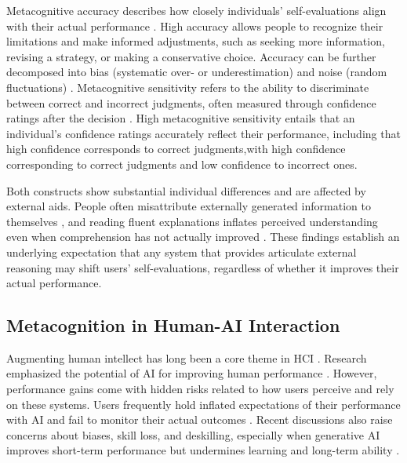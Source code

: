 \documentclass[manuscript, anonymous=false,authorversion,review=false]{acmart}
\begin{document}
Metacognitive accuracy describes how closely individuals' self-evaluations align with their actual performance \cite{fleming2024metacognition, colombatto2023illusions}. High accuracy allows people to recognize their limitations and make informed adjustments, such as seeking more information, revising a strategy, or making a conservative choice. Accuracy can be further decomposed into bias (systematic over- or underestimation) and noise (random fluctuations) \cite{fiedler2019metacognition}. Metacognitive sensitivity refers to the ability to discriminate between correct and incorrect judgments, often measured through confidence ratings after the decision \cite{fleming2024metacognition}. High metacognitive sensitivity entails that an individual's confidence ratings accurately reflect their performance, including that high confidence corresponds to correct judgments,with high confidence corresponding to correct judgments and low confidence to incorrect ones.

Both constructs show substantial individual differences \cite{kelemen2000individual, ackerman2017meta} and are affected by external aids. People often misattribute externally generated information to themselves \cite{johnson_source_1993, Zindulka2026AIMemoryGap}, and reading fluent explanations inflates perceived understanding even when comprehension has not actually improved \cite{fisher2021harder}. These findings establish an underlying expectation that any system that provides articulate external reasoning may shift users' self-evaluations, regardless of whether it improves their actual performance.

\subsection{Metacognition in Human-AI Interaction}
Augmenting human intellect has long been a core theme in HCI \cite{engelbart1962augmenting}. Research emphasized the potential of AI for improving human performance \cite{10.1145/3411764.3445717, steyvers_bayesian_2022,zulfikar_memoro_2024, tankelevitch2025understanding}.
However, performance gains come with hidden risks related to how users perceive and rely on these systems. Users frequently hold inflated expectations of their performance with AI and fail to monitor their actual outcomes \cite{FERNANDES2026108779, kloft2023ai, villa2023placebo, kosch2023placebo, colombatto2025metacognition, von2025knowing}. Recent discussions also raise concerns about biases, skill loss, and deskilling, especially when generative AI improves short-term performance but undermines learning and long-term ability \cite{bastani2024generative, rafner2022deskilling, Kobiella2024, stadler_cognitive_2024}.
\end{document}
